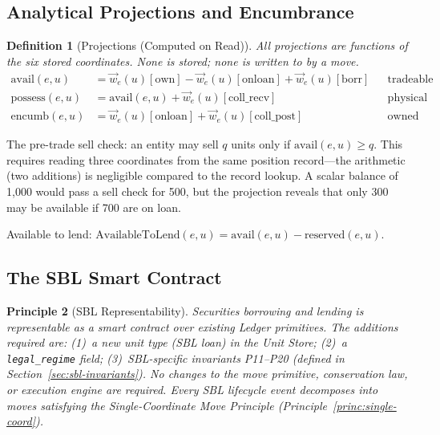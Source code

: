 \documentclass[11pt,a4paper]{article}
\newtheorem{definition}{Definition}[section]
\newtheorem{principle}[definition]{Principle}
\begin{document}
\subsection{Analytical Projections and Encumbrance}
\label{sec:projections}

\begin{definition}[Projections (Computed on Read)]
\label{def:projections}
All projections are functions of the six stored coordinates. None is stored; none is written to by a move.
\begin{align*}
\mathrm{avail}(e, u) &= \vec{w}_e(u)[\mathrm{own}] - \vec{w}_e(u)[\mathrm{onloan}] + \vec{w}_e(u)[\mathrm{borr}] && \text{tradeable inventory} \\
\mathrm{possess}(e, u) &= \mathrm{avail}(e,u) + \vec{w}_e(u)[\mathrm{coll\_recv}] && \text{physical custody} \\
\mathrm{encumb}(e, u) &= \vec{w}_e(u)[\mathrm{onloan}] + \vec{w}_e(u)[\mathrm{coll\_post}] && \text{owned but not tradeable}
\end{align*}
\end{definition}

\noindent The pre-trade sell check: an entity may sell $q$ units only if $\mathrm{avail}(e, u) \geq q$. This requires reading three coordinates from the same position record---the arithmetic (two additions) is negligible compared to the record lookup. A scalar balance of 1{,}000 would pass a sell check for 500, but the projection reveals that only 300 may be available if 700 are on loan.

Available to lend: $\text{AvailableToLend}(e, u) = \mathrm{avail}(e,u) - \text{reserved}(e, u)$.

\subsection{The SBL Smart Contract}
\label{sec:sbl-contract}

\begin{principle}[SBL Representability]
Securities borrowing and lending is representable as a smart contract over existing Ledger primitives. The additions required are: (1)~a new unit type (SBL loan) in the Unit Store; (2)~a \texttt{legal\_regime} field; (3)~SBL-specific invariants P11--P20 (defined in Section~\ref{sec:sbl-invariants}). No changes to the move primitive, conservation law, or execution engine are required. Every SBL lifecycle event decomposes into moves satisfying the Single-Coordinate Move Principle (Principle~\ref{princ:single-coord}).
\end{principle}
\end{document}
